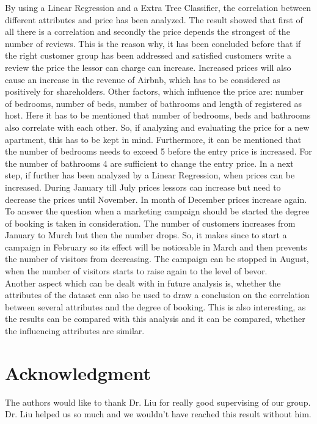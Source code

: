 \documentclass[journal]{IEEEtran}
\begin{document}
By using a Linear Regression and a Extra Tree Classifier, the correlation between different attributes and price has been analyzed. The result showed that first of all there is a correlation and secondly the price depends the strongest of the number of reviews. This is the reason why, it has been concluded before that if the right customer group has been addressed and satisfied customers write a review the price the lessor can charge can increase. Increased prices will also cause an increase in the revenue of Airbnb, which has to be considered as positively for shareholders. Other factors, which influence the price are: number of bedrooms, number of beds, number of bathrooms and length of registered as host. Here it has to be mentioned that number of bedrooms, beds and bathrooms also correlate with each other. So, if analyzing and evaluating the price for a new apartment, this has to be kept in mind. Furthermore, it can be mentioned that the number of bedrooms needs to exceed 5 before the entry price is increased. For the number of bathrooms 4 are sufficient to change the entry price. In a next step, if further has been analyzed by a Linear Regression, when prices can be increased. During January till July prices lessors can increase but need to decrease the prices until November. In month of December prices increase again.\\
To answer the question when a marketing campaign should be started the degree of booking is taken in consideration. The number of customers increases from January to Murch but then the number drops. So, it makes since to start a campaign in February so its effect will be noticeable in March and then prevents the number of visitors from decreasing. The campaign can be stopped in August, when the number of visitors starts to raise again to the level of bevor.\\
Another aspect which can be dealt with in future analysis is, whether the attributes of the dataset can also be used to draw a conclusion on the correlation between several attributes and the degree of booking. This is also interesting, as the results can be compared with this analysis and it can be compared, whether the influencing attributes are similar.





\section*{Acknowledgment}
\noindent The authors would like to thank Dr. Liu for really good supervising of our group. Dr. Liu helped us so much and we wouldn't have reached this result without him. 
\end{document}

